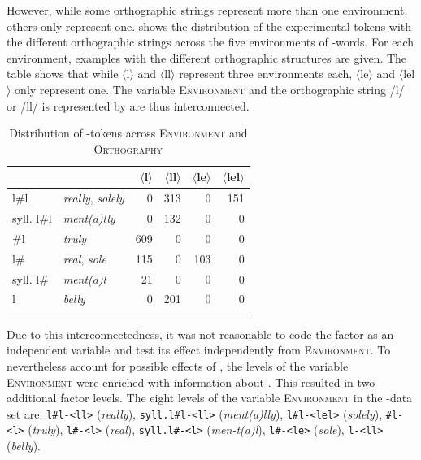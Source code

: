  However, while some orthographic strings represent more than one environment, others only represent one. 
 shows the distribution of the experimental tokens with the different orthographic strings across the five environments of -words. For each environment, examples with the different orthographic structures are given.
The table shows that while $\langle$l$\rangle$ and  $\langle$ll$\rangle$  represent three environments each,  $\langle$le$\rangle$ and $\langle$lel$\rangle$ only represent one. 
The variable \textsc{Environment} and the orthographic string /l/ or /ll/ is represented by are thus interconnected. 


\begin{table}
	\caption{Distribution of -tokens across \textsc{Environment} and \textsc{Orthography}}
	\label{tab: ly dazta ortho and environment}
	
	
		\begin{tabular}{llrrrr}
				\lsptoprule
			&      & $\langle$l$\rangle$  & $\langle$ll$\rangle$ & $\langle$le$\rangle$ & $\langle$lel$\rangle$ \\
			\midrule
			l\#l  &\textit{really}, \textit{solely}   
			&       0 &     313  &   0&    151\\
			
			syll. l\#l &\textit{ment(a)lly}   &   0 &     132    &   0 &   0\\
			
			\#l   &\textit{truly} &        609   &   0    &   0  &    0\\
			
			l\#   &\textit{real}, \textit{sole} &        115&   0  &         103& 0\\
			
			syll. l\#&\textit{ment(a)l} &         21&   0  &    0 &     0\\
			
			l        &\textit{belly}  &    0 &    201    &   0 &   0\\
			\lspbottomrule                                                                                
		\end{tabular}
	
\end{table}

 Due to this interconnectedness, it was not reasonable to code the factor  as an independent variable and test its effect independently from \textsc{Environment}. 
 To nevertheless account for possible effects of , the levels of the variable \textsc{Environment} were enriched with information about . 
This resulted in two additional factor levels.\largerpage
   The eight levels of the variable \textsc{Environment} in the -data set are: \texttt{l\#l-<ll>} (\textit{really}), \texttt{syll.l\#l-<ll>} (\textit{ment(a)lly}), \texttt{l\#l-<lel>} (\textit{solely}), \texttt{\#l-<l>} (\textit{truly}), \texttt{l\#-<l>} (\textit{real}), \texttt{syll.l\#-<l>} (\textit{men-t(a)l}),  \texttt{l\#-<le>} (\textit{sole}), \texttt{l-<ll> }(\textit{belly}). 		

